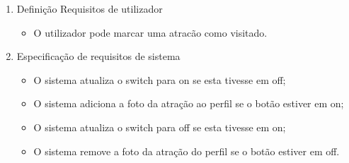 \begin{enumerate}
    \item Definição Requisitos de utilizador
    \begin{itemize}
        \item O utilizador pode marcar uma atracão como visitado.
    \end{itemize}
    \item Especificação de requisitos de sistema
    \begin{itemize}
        \item O sistema atualiza o switch para on se esta tivesse em off;
        \item O sistema adiciona a foto da atração ao perfil se o botão estiver em on;
        \item O sistema atualiza o switch para off se esta tivesse em on;
        \item O sistema remove a foto da atração do perfil se o botão estiver em off.
    \end{itemize}
\end{enumerate}